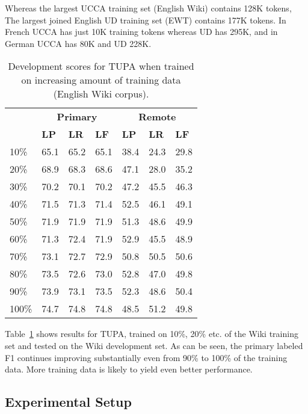 \documentclass[11pt,a4paper]{article}
\begin{document}
Whereas the largest UCCA training set (English Wiki) contains 128K tokens,
The largest joined English UD training set (EWT) contains 177K tokens.
In French UCCA has just 10K training tokens whereas UD has 295K,
and in German UCCA has 80K and UD 228K.

\begin{table}[t]
\centering
\begin{tabular}{l|lll|lll}
& \multicolumn{3}{c|}{\footnotesize \bf Primary} & \multicolumn{3}{c}{\footnotesize \bf Remote} \\
& \footnotesize \textbf{LP} & \footnotesize \textbf{LR} & \footnotesize \textbf{LF}
& \footnotesize \textbf{LP} & \footnotesize \textbf{LR} & \footnotesize \textbf{LF} \\
\hline
\footnotesize 10\% & 65.1 & 65.2 & 65.1 & 38.4 & 24.3 & 29.8\\
\footnotesize 20\% & 68.9 & 68.3 & 68.6 & 47.1 & 28.0 & 35.2\\
\footnotesize 30\% & 70.2 & 70.1 & 70.2 & 47.2 & 45.5 & 46.3\\
\footnotesize 40\% & 71.5 & 71.3 & 71.4 & 52.5 & 46.1 & 49.1\\
\footnotesize 50\% & 71.9 & 71.9 & 71.9 & 51.3 & 48.6 & 49.9\\
\footnotesize 60\% & 71.3 & 72.4 & 71.9 & 52.9 & 45.5 & 48.9\\
\footnotesize 70\% & 73.1 & 72.7 & 72.9 & 50.8 & 50.5 & 50.6\\
\footnotesize 80\% & 73.5 & 72.6 & 73.0 & 52.8 & 47.0 & 49.8\\
\footnotesize 90\% & 73.9 & 73.1 & 73.5 & 52.3 & 48.6 & 50.4\\
\footnotesize 100\% & 74.7 & 74.8 & 74.8 & 48.5 & 51.2 & 49.8\\
\end{tabular}
\caption{
Development scores for TUPA \protect\cite{hershcovich2017a} when trained on increasing amount of training data
(English Wiki corpus).
\label{tab:partial_data_results}}
\end{table}

Table~\ref{tab:partial_data_results} shows results for TUPA,
trained on 10\%, 20\% etc. of the Wiki training set and tested on the Wiki development set.
As can be seen, the primary labeled F1 continues improving substantially even from 90\% to 100\%
of the training data. More training data is likely to yield even better performance.

\subsection{Experimental Setup}\label{sec:experiments}
\end{document}
